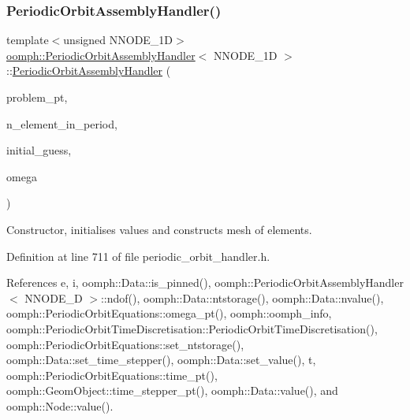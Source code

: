 \subsubsection{\texorpdfstring{Periodic\+Orbit\+Assembly\+Handler()}{PeriodicOrbitAssemblyHandler()}}
{\footnotesize\ttfamily template$<$unsigned N\+N\+O\+D\+E\+\_\+1D$>$ \\
\hyperlink{classoomph_1_1PeriodicOrbitAssemblyHandler}{oomph\+::\+Periodic\+Orbit\+Assembly\+Handler}$<$ N\+N\+O\+D\+E\+\_\+1D $>$\+::\hyperlink{classoomph_1_1PeriodicOrbitAssemblyHandler}{Periodic\+Orbit\+Assembly\+Handler} (\begin{DoxyParamCaption}\item[{\hyperlink{classoomph_1_1Problem}{Problem} $\ast$const \&}]{problem\+\_\+pt,  }\item[{const unsigned \&}]{n\+\_\+element\+\_\+in\+\_\+period,  }\item[{const \hyperlink{classoomph_1_1DenseMatrix}{Dense\+Matrix}$<$ double $>$ \&}]{initial\+\_\+guess,  }\item[{const double \&}]{omega }\end{DoxyParamCaption})\hspace{0.3cm}{\ttfamily [inline]}}



Constructor, initialises values and constructs mesh of elements. 



Definition at line 711 of file periodic\+\_\+orbit\+\_\+handler.\+h.



References e, i, oomph\+::\+Data\+::is\+\_\+pinned(), oomph\+::\+Periodic\+Orbit\+Assembly\+Handler$<$ N\+N\+O\+D\+E\+\_\+D $>$\+::ndof(), oomph\+::\+Data\+::ntstorage(), oomph\+::\+Data\+::nvalue(), oomph\+::\+Periodic\+Orbit\+Equations\+::omega\+\_\+pt(), oomph\+::oomph\+\_\+info, oomph\+::\+Periodic\+Orbit\+Time\+Discretisation\+::\+Periodic\+Orbit\+Time\+Discretisation(), oomph\+::\+Periodic\+Orbit\+Equations\+::set\+\_\+ntstorage(), oomph\+::\+Data\+::set\+\_\+time\+\_\+stepper(), oomph\+::\+Data\+::set\+\_\+value(), t, oomph\+::\+Periodic\+Orbit\+Equations\+::time\+\_\+pt(), oomph\+::\+Geom\+Object\+::time\+\_\+stepper\+\_\+pt(), oomph\+::\+Data\+::value(), and oomph\+::\+Node\+::value().

\mbox{\label{classoomph_1_1PeriodicOrbitAssemblyHandler_a919aba117d2e7f08d1462b9d00799782}} 
